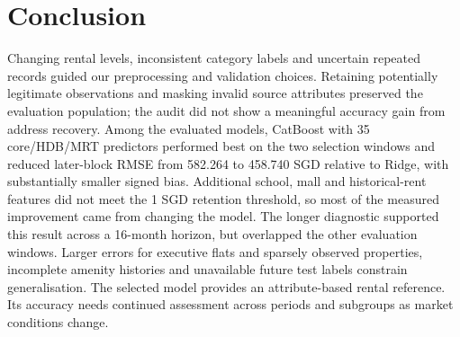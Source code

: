 \documentclass[conference]{IEEEtran}
\begin{document}
\section{Conclusion}
\label{sec:conclusion}
Changing rental levels, inconsistent category labels and uncertain repeated
records guided our preprocessing and validation choices. Retaining potentially legitimate observations and masking invalid
source attributes preserved the evaluation population; the audit did not
show a meaningful accuracy gain from address recovery. Among the evaluated
models, CatBoost with 35 core/HDB/MRT predictors performed best on the two
selection windows and reduced later-block RMSE from 582.264 to 458.740 SGD
relative to Ridge, with substantially smaller signed bias. Additional
school, mall and historical-rent features did not meet the 1 SGD retention
threshold, so most of the measured improvement came from changing the model.
The longer diagnostic supported this result across a 16-month horizon,
but overlapped the other evaluation windows. Larger errors for executive
flats and sparsely observed properties, incomplete amenity histories and
unavailable future test labels constrain generalisation. The selected model provides an attribute-based rental reference. Its accuracy
needs continued assessment across periods and subgroups as market conditions
change.
\end{document}
